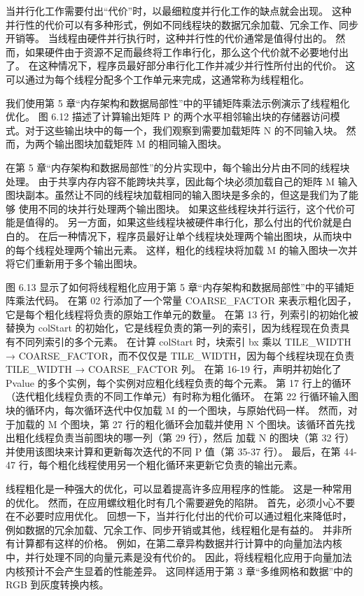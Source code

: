 当并行化工作需要付出“代价”时，以最细粒度并行化工作的缺点就会出现。 这种并行性的代价可以有多种形式，例如不同线程块的数据冗余加载、冗余工作、同步开销等。 当线程由硬件并行执行时，这种并行性的代价通常是值得付出的。 然而，如果硬件由于资源不足而最终将工作串行化，那么这个代价就不必要地付出了。 在这种情况下，程序员最好部分串行化工作并减少并行性所付出的代价。 这可以通过为每个线程分配多个工作单元来完成，这通常称为线程粗化。

我们使用第 5 章“内存架构和数据局部性”中的平铺矩阵乘法示例演示了线程粗化优化。 图 6.12 描述了计算输出矩阵 P 的两个水平相邻输出块的存储器访问模式。对于这些输出块中的每一个，我们观察到需要加载矩阵 N 的不同输入块。 然而，为两个输出图块加载矩阵 M 的相同输入图块。

在第 5 章“内存架构和数据局部性”的分片实现中，每个输出分片由不同的线程块处理。 由于共享内存内容不能跨块共享，因此每个块必须加载自己的矩阵 M 输入图块副本。虽然让不同的线程块加载相同的输入图块是多余的，但这是我们为了能够 使用不同的块并行处理两个输出图块。 如果这些线程块并行运行，这个代价可能是值得的。 另一方面，如果这些线程块被硬件串行化，那么付出的代价就是白白的。 在后一种情况下，程序员最好让单个线程块处理两个输出图块，从而块中的每个线程处理两个输出元素。 这样，粗化的线程块将加载 M 的输入图块一次并将它们重新用于多个输出图块。

图 6.13 显示了如何将线程粗化应用于第 5 章“内存架构和数据局部性”中的平铺矩阵乘法代码。 在第 02 行添加了一个常量 COARSE\_FACTOR 来表示粗化因子，它是每个粗化线程将负责的原始工作单元的数量。 在第 13 行，列索引的初始化被替换为 colStart 的初始化，它是线程负责的第一列的索引，因为线程现在负责具有不同列索引的多个元素。 在计算 colStart 时，块索引 bx 乘以 TILE\_WIDTH → COARSE\_FACTOR，而不仅仅是 TILE\_WIDTH，因为每个线程块现在负责 TILE\_WIDTH → COARSE\_FACTOR 列。 在第 16-19 行，声明并初始化了 Pvalue 的多个实例，每个实例对应粗化线程负责的每个元素。 第 17 行上的循环（迭代粗化线程负责的不同工作单元）有时称为粗化循环。 在第 22 行循环输入图块的循环内，每次循环迭代中仅加载 M 的一个图块，与原始代码一样。 然而，对于加载的 M 个图块，第 27 行的粗化循环会加载并使用 N 个图块。该循环首先找出粗化线程负责当前图块的哪一列（第 29 行），然后 加载 N 的图块（第 32 行）并使用该图块来计算和更新每次迭代的不同 P 值（第 35-37 行）。 最后，在第 44-47 行，每个粗化线程使用另一个粗化循环来更新它负责的输出元素。

线程粗化是一种强大的优化，可以显着提高许多应用程序的性能。 这是一种常用的优化。 然而，在应用螺纹粗化时有几个需要避免的陷阱。 首先，必须小心不要在不必要时应用优化。 回想一下，当并行化付出的代价可以通过粗化来降低时，例如数据的冗余加载、冗余工作、同步开销或其他，线程粗化是有益的。 并非所有计算都有这样的价格。 例如，在第二章异构数据并行计算中的向量加法内核中，并行处理不同的向量元素是没有代价的。 因此，将线程粗化应用于向量加法内核预计不会产生显着的性能差异。 这同样适用于第 3 章“多维网格和数据”中的 RGB 到灰度转换内核。

